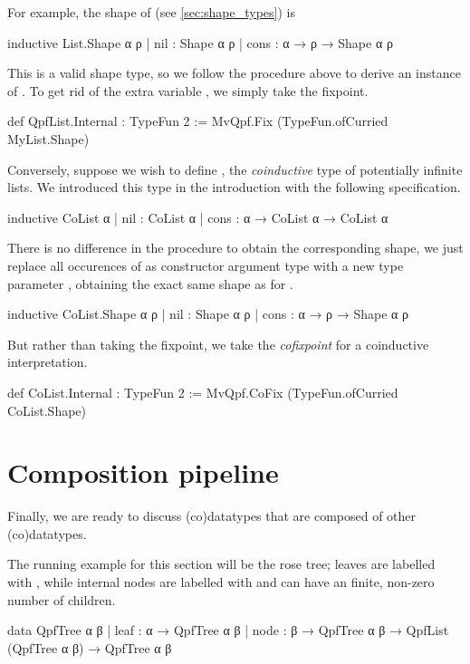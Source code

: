 For example, the shape of  (see \cref{sec:shape_types}) is
\begin{leancode}
  inductive List.Shape α ρ
    | nil  : Shape α ρ
    | cons : α → ρ → Shape α ρ
\end{leancode}
This is a valid shape type, so we follow the procedure above to derive an instance of .
To get rid of the extra variable , we simply take the fixpoint.
\begin{leancode}
  def QpfList.Internal : TypeFun 2 
    := MvQpf.Fix (TypeFun.ofCurried MyList.Shape)
\end{leancode}

Conversely, suppose we wish to define , the \emph{coinductive} type of potentially infinite lists.
We introduced this type in the introduction with the following specification.
\begin{leancode}
  inductive CoList α
    | nil  : CoList α
    | cons : α → CoList α → CoList α
\end{leancode}
There is no difference in the procedure to obtain the corresponding shape, we just replace all occurences
of  as constructor argument type with a new type parameter , obtaining the exact same shape
as for .
\begin{leancode}
  inductive CoList.Shape α ρ
    | nil  : Shape α ρ
    | cons : α → ρ → Shape α ρ
\end{leancode}
But rather than taking the fixpoint, we take the \emph{cofixpoint} for a coinductive interpretation.
\begin{leancode}
  def CoList.Internal : TypeFun 2 
    := MvQpf.CoFix (TypeFun.ofCurried CoList.Shape)
\end{leancode}





\section{Composition pipeline}%
\label{sec:comp_pipeline}
Finally, we are ready to discuss (co)datatypes that are composed of other (co)datatypes.

The running example for this section will be the rose tree; leaves are labelled with , while
internal nodes are labelled with  and can have an finite, non-zero number of children.
\begin{leancode}
    data QpfTree α β
      | leaf : α → QpfTree α β
      | node : β → QpfTree α β → QpfList (QpfTree α β) → QpfTree α β
\end{leancode}


